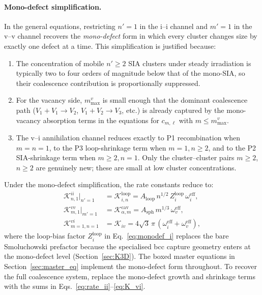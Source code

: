 \paragraph{Mono-defect simplification.}
In the general equations, restricting $n' = 1$ in the i--i channel and
$m' = 1$ in the v--v channel recovers the \emph{mono-defect} form in which
every cluster changes size by exactly one defect at a time. This
simplification is justified because:
\begin{enumerate}
    \item The concentration of mobile $n' \geq 2$ SIA clusters under steady
    irradiation is typically two to four orders of magnitude below that of
    the mono-SIA, so their coalescence contribution is proportionally
    suppressed.
    \item For the vacancy side, $m_{\max}^v$ is small enough that the
    dominant coalescence path ($V_1 + V_1 \to V_2$, $V_1 + V_2 \to V_3$,
    etc.) is already captured by the mono-vacancy absorption terms in the
    equations for $c_{m,\ell}$ with $m \leq m_{\max}^v$.
    \item The v--i annihilation channel reduces exactly to P1 recombination
    when $m = n = 1$, to the P3 loop-shrinkage term when $m = 1, n \geq 2$,
    and to the P2 SIA-shrinkage term when $m \geq 2, n = 1$. Only the
    cluster--cluster pairs $m \geq 2$, $n \geq 2$ are genuinely new; these
    are small at low cluster concentrations.
\end{enumerate}
Under the mono-defect simplification, the rate constants reduce to:
\begin{align}
    \mathcal{K}_{n,1}^{ii}\big|_{n'=1}
    &= \mathcal{K}_{i,n}^{\mathrm{loop}}
     = A_{\mathrm{loop}}\,n^{1/2}\,Z_i^{\mathrm{loop}}\,\omega_i^{\mathrm{eff}},
    \label{eq:monodef_i}\\[4pt]
    \mathcal{K}_{m,1}^{vv}\big|_{m'=1}
    &= \mathcal{K}_{\alpha,m}^{\mathrm{cav}}
     = A_{\mathrm{sph}}\,m^{1/3}\,\omega_v^{\mathrm{eff}},
    \label{eq:monodef_v}\\[4pt]
    \mathcal{K}_{m=1,n=1}^{vi}
    &= \mathcal{K}_{iv}
     = 4\sqrt{3}\,\pi\,(\omega_i^{\mathrm{eff}}+\omega_v^{\mathrm{eff}}),
    \label{eq:monodef_iv}
\end{align}
where the loop-bias factor $Z_i^{\mathrm{loop}}$ in
Eq.~\eqref{eq:monodef_i} replaces the bare Smoluchowski prefactor because
the specialised bcc capture geometry enters at the mono-defect level
(Section~\ref{sec:K3D}). The boxed master equations in
Section~\ref{sec:master_eq} implement the mono-defect form throughout. To
recover the full coalescence system, replace the mono-defect growth and
shrinkage terms with the sums in
Eqs.~\eqref{eq:rate_ii}--\eqref{eq:K_vi}.



